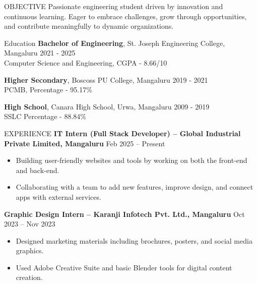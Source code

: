 \documentclass{resume} %
\begin{document}
\begin{rSection}{OBJECTIVE}
{Passionate engineering student driven by innovation and continuous learning. Eager to embrace challenges, grow through opportunities, and contribute meaningfully to dynamic organizations.}
\end{rSection}
\begin{rSection}{Education}
{\bf Bachelor of Engineering}, St. Joseph Engineering College, Mangaluru \hfill {2021 - 2025}\\
Computer Science and Engineering, CGPA - 8.66/10

{\bf Higher Secondary}, Boscoss PU College, Mangaluru \hfill {2019 - 2021}\\
PCMB, Percentage - 95.17\%

{\bf High School}, Canara High School, Urwa, Mangaluru \hfill {2009 - 2019}\\
SSLC Percentage - 88.84\%

\end{rSection}
\begin{rSection}{EXPERIENCE} 
    \textbf{IT Intern (Full Stack Developer) – Global Industrial Private Limited, Mangaluru} \hfill Feb 2025 – Present
    \begin{itemize}
        \itemsep -3pt {}
        \item Building user-friendly websites and tools by working on both the front-end and back-end.
        \item Collaborating with a team to add new features, improve design, and connect apps with external services.
    \end{itemize}
    \textbf{Graphic Design Intern – Karanji Infotech Pvt. Ltd., Mangaluru} \hfill Oct 2023 – Nov 2023
    \begin{itemize}
        \itemsep -3pt {}
        \item Designed marketing materials including brochures, posters, and social media graphics.
        \item Used Adobe Creative Suite and basic Blender tools for digital content creation.
    \end{itemize}
\end{rSection}
\end{document}
